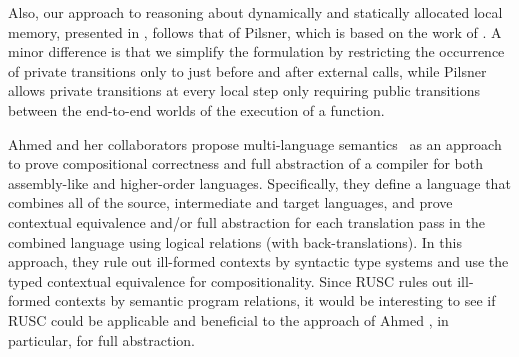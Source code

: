{Also, our approach to reasoning about dynamically and statically
allocated local memory, presented in ,
follows that of Pilsner, which is based on the work of
\cite{DBLP:conf/icfp/DreyerNB10}. A minor difference is that we
simplify the formulation by restricting the occurrence of private
transitions only to just before and after external calls, while
Pilsner allows private transitions at every local step only requiring
public transitions between the end-to-end worlds of the execution of a
function.








%
Ahmed and her collaborators propose multi-language
semantics~\cite{perconti:multilang,patterson:funtal,DBLP:conf/fossacs/SchererNRA18,New:2016,ICFP19}
as an approach to prove compositional correctness and full abstraction
of a compiler for both assembly-like and higher-order languages.
Specifically, they define a language that combines all of the source,
intermediate and target languages, and prove contextual equivalence
and/or full abstraction for each translation pass in the combined
language using logical relations (with back-translations).  In this
approach, they rule out ill-formed contexts by syntactic type systems
and use the typed contextual equivalence for compositionality.  Since RUSC
rules out ill-formed contexts by semantic program relations, it would
be interesting to see if RUSC could be applicable and beneficial to
the approach of Ahmed \etal, in particular, for full abstraction.


}
